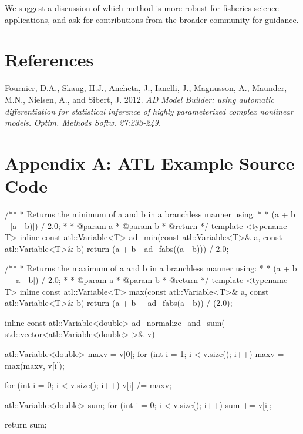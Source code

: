 \documentclass[oneside]{article}
\begin{document}
We suggest a discussion of which method is more robust for fisheries science applications, and ask for contributions from the broader community for guidance.

\section{References}
\begin{thebibliography}{9}

Fournier, D.A., Skaug, H.J., Ancheta, J., Ianelli, J., Magnusson, A., Maunder, M.N., Nielsen, A., and Sibert, J. 2012.
\textit{AD Model Builder: using automatic differentiation for statistical inference of highly parameterized complex nonlinear models.}
\textit{Optim. Methods Softw. 27:233-249.}

\end{thebibliography}
\section{Appendix A: ATL Example Source Code}

\begin{cppsource}

/**
 * Returns the minimum of a and b in a branchless manner using:
 *
 * (a + b - |a - b)|) / 2.0;
 *
 * @param a
 * @param b
 * @return
 */
template <typename T>
inline const atl::Variable<T> ad_min(const atl::Variable<T>& a,
const atl::Variable<T>& b) {
    return (a + b - ad_fabs((a - b))) / 2.0;
}

/**
 * Returns the maximum of a and b in a branchless manner using:
 *
 * (a + b + |a - b|) / 2.0;
 *
 * @param a
 * @param b
 * @return
 */
template <typename T>
inline const atl::Variable<T> max(const atl::Variable<T>& a,
 const atl::Variable<T>& b) {
    return (a + b + ad_fabs(a - b)) / (2.0);
}


inline const atl::Variable<double> ad_normalize_and_sum(
std::vector<atl::Variable<double> >& v) {
    atl::Variable<double> maxv = v[0];
    for (int i = 1; i < v.size(); i++) {
        maxv = max(maxv, v[i]);
    }

    for (int i = 0; i < v.size(); i++) {
        v[i] /= maxv;
    }

    atl::Variable<double> sum;
    for (int i = 0; i < v.size(); i++) {
        sum += v[i];
    }

    return sum;
}
\end{cppsource}
\end{document}
